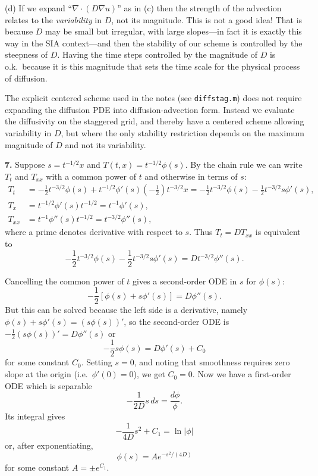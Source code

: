 \documentclass[10pt]{amsart}
\newcommand{\Div}{\nabla\cdot}
\newcommand{\grad}{\nabla}
\newcommand{\prob}[1]{\bigskip\noindent\large\textbf{#1.}\normalsize }
\begin{document}
\medskip
\noindent (d)  If we expand ``$\Div \left(D \grad u\right)$'' as in (c) then the strength of the advection relates to the \emph{variability} in $D$, not its magnitude.  This is not a good idea!  That is because $D$ may be small but irregular, with large slopes---in fact it is exactly this way in the SIA context---and then the stability of our scheme is controlled by the steepness of $D$.  Having the time steps controlled by the magnitude of $D$ is o.k.~because it is this magnitude that sets the time scale for the physical process of diffusion.

The explicit centered scheme used in the notes (see \texttt{diffstag.m}) does not require expanding the diffusion PDE into diffusion-advection form.  Instead we evaluate the diffusivity on the staggered grid, and thereby have a centered scheme allowing variability in $D$, but where the only stability restriction depends on the maximum magnitude of $D$ and not its variability.


\prob{7}  Suppose $s = t^{-1/2} x$ and $T(t,x)=t^{-1/2} \phi(s)$.  By the chain rule we can write $T_t$ and $T_{xx}$ with a common power of $t$ and otherwise in terms of $s$:
\begin{align*}
T_t &= - \frac{1}{2} t^{-3/2} \phi(s) + t^{-1/2} \phi'(s) \left(-\frac{1}{2}\right) t^{-3/2} x = - \frac{1}{2} t^{-3/2} \phi(s) - \frac{1}{2} t^{-3/2} s \phi'(s), \\
T_x &= t^{-1/2} \phi'(s) t^{-1/2} = t^{-1} \phi'(s), \\
T_{xx} &= t^{-1} \phi''(s) t^{-1/2} = t^{-3/2} \phi''(s),
\end{align*}
where a prime denotes derivative with respect to $s$.  Thus $T_t = D T_{xx}$ is equivalent to
    $$- \frac{1}{2} t^{-3/2} \phi(s) - \frac{1}{2} t^{-3/2} s \phi'(s) = D t^{-3/2} \phi''(s).$$

Cancelling the common power of $t$ gives a second-order ODE in $s$ for $\phi(s)$:
    $$- \frac{1}{2} \left[\phi(s) + s \phi'(s)\right] = D \phi''(s).$$
But this can be solved because the left side is a derivative, namely $\phi(s) + s \phi'(s) = \left(s \phi(s)\right)'$, so the second-order ODE is $- \frac{1}{2} \left(s \phi(s)\right)' = D \phi''(s)$ or
    $$- \frac{1}{2} s \phi(s) = D \phi'(s) + C_0$$
for some constant $C_0$.  Setting $s=0$, and noting that smoothness requires zero slope at the origin (i.e.~$\phi'(0)=0$), we get $C_0=0$.  Now we have a first-order ODE which is separable
    $$- \frac{1}{2D} s \,ds = \frac{d\phi}{\phi}.$$
Its integral gives
    $$- \frac{1}{4D} s^2 + C_1 = \ln|\phi|$$
or, after exponentiating,
    $$\phi(s) = A e^{- s^2/(4D)}$$
for some constant $A = \pm e^{C_1}$.
\end{document}
